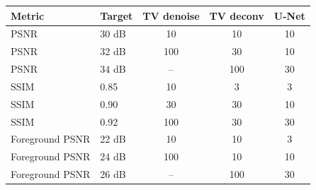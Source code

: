 \begin{tabular}{llccc}
\toprule
Metric & Target & TV denoise & TV deconv & U-Net \\
\midrule
PSNR & 30 dB & 10 & 10 & 10 \\
PSNR & 32 dB & 100 & 30 & 10 \\
PSNR & 34 dB & -- & 100 & 30 \\
SSIM & 0.85 & 10 & 3 & 3 \\
SSIM & 0.90 & 30 & 30 & 10 \\
SSIM & 0.92 & 100 & 30 & 30 \\
Foreground PSNR & 22 dB & 10 & 10 & 3 \\
Foreground PSNR & 24 dB & 100 & 10 & 10 \\
Foreground PSNR & 26 dB & -- & 100 & 30 \\
\bottomrule
\end{tabular}
